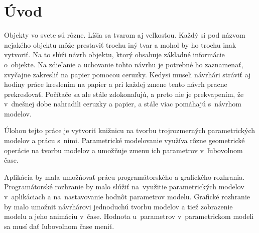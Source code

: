 

\chapter{Úvod}

Objekty vo svete sú rôzne. Líšia sa tvarom aj veľkosťou. 
Každý si pod názvom nejakého objektu môže prestaviť trochu iný tvar a mohol by ho trochu inak vytvoriť. Na to slúži návrh objektu, ktorý obsahuje základné informácie o~objekte. Na zdieľanie a uchovanie tohto návrhu je potrebné ho zaznamenať, zvyčajne zakresliť  na papier pomocou ceruzky. Kedysi museli návrhári stráviť aj hodiny práce kreslením na papier a pri každej zmene tento návrh pracne prekresľovať. 
Počítače sa ale stále zdokonaľujú, a preto nie je prekvapením, že v~dnešnej dobe nahradili ceruzky a papier, a stále viac pomáhajú s~návrhom modelov.






Úlohou tejto práce je vytvoriť knižnicu na tvorbu trojrozmerných parametrických modelov a prácu s~nimi. Parametrické modelovanie využíva rôzne geometrické operácie na tvorbu modelov a umožňuje zmenu ich parametrov v~ľubovolnom čase. 



Aplikácia by mala umožňovať prácu programátorského a grafického rozhrania. Programátorské rozhranie by malo slúžiť na~využitie parametrických modelov v~aplikáciach a na~nastavovanie hodnôt parametrov modelu. Grafické rozhranie by malo umožniť návrhárovi jednoduchú tvorbu modelov a tiež zobrazenie modelu a jeho animáciu v~čase. Hodnota u~parametrov v~parametrickom modeli sa musí dať ľubovoľnom čase meniť.



